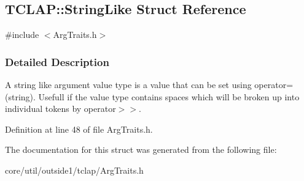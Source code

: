 \hypertarget{structTCLAP_1_1StringLike}{}\subsection{T\+C\+L\+AP\+:\+:String\+Like Struct Reference}
\label{structTCLAP_1_1StringLike}


{\ttfamily \#include $<$Arg\+Traits.\+h$>$}



\subsubsection{Detailed Description}
A string like argument value type is a value that can be set using operator=(string). Usefull if the value type contains spaces which will be broken up into individual tokens by operator$>$$>$. 

Definition at line 48 of file Arg\+Traits.\+h.



The documentation for this struct was generated from the following file\+:\begin{DoxyCompactItemize}
\item 
core/util/outside1/tclap/Arg\+Traits.\+h\end{DoxyCompactItemize}
